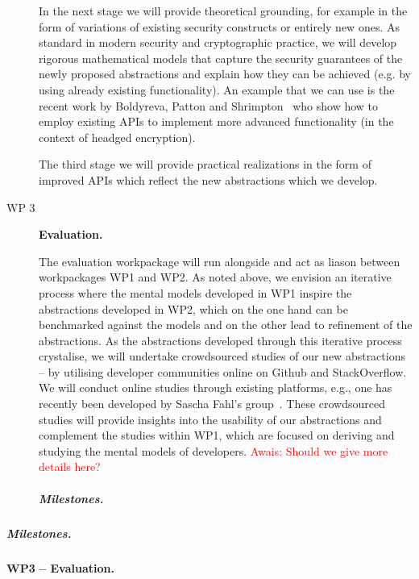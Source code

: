 \documentclass[10pt]{article}
\newcommand{\ar}[1]{{\textcolor{red} {Awais: #1}}}
\begin{document}
\begin{description}
In the next stage we will provide theoretical grounding, for example in the form of variations of existing security constructs or entirely new ones.  As standard in modern security and cryptographic practice, we will develop rigorous mathematical models that capture the security guarantees of the newly proposed abstractions and explain how they can be achieved (e.g. by using already existing functionality).  
An example that we can use is the recent work by Boldyreva, Patton and Shrimpton~\cite{} who show how to employ existing APIs to implement more advanced functionality (in the context of headged encryption).  

 The third stage we will provide practical realizations in the form of improved APIs which reflect the new abstractions which we develop.  
\iffalse
Technically, we will provide wrappers to some of the most commonly used libraries.  
We remark that improved APIs is one of the feature of the NaCl cryptographic library~\cite{bernstein}; currently that library only considers lower level primitives.  
\fi

\item[WP 3] \textbf{Evaluation.}

The evaluation workpackage will run alongside and act as liason between workpackages WP1 and WP2.  
As noted above, we envision an iterative process where the mental models developed in WP1 inspire the abstractions developed in WP2, which on the one hand can be benchmarked against the models and on the other lead to refinement of the abstractions. As the abstractions developed through this iterative process crystalise, we will undertake crowdsourced studies of our new abstractions -- by utilising developer communities online on Github and StackOverflow. We will conduct online studies through existing platforms, e.g., one has recently been developed by Sascha Fahl's group~\cite{stransky2017}. These crowdsourced studies will provide insights into the usability of our abstractions and complement the studies within WP1, which are focused on deriving and studying the mental models of developers. \ar{Should we give more details here?}

\vspace{-\baselineskip}
\subparagraph{Milestones.}


\end{description}



\subparagraph{Milestones.}



\paragraph{WP3 -- Evaluation.}  
\end{document}
